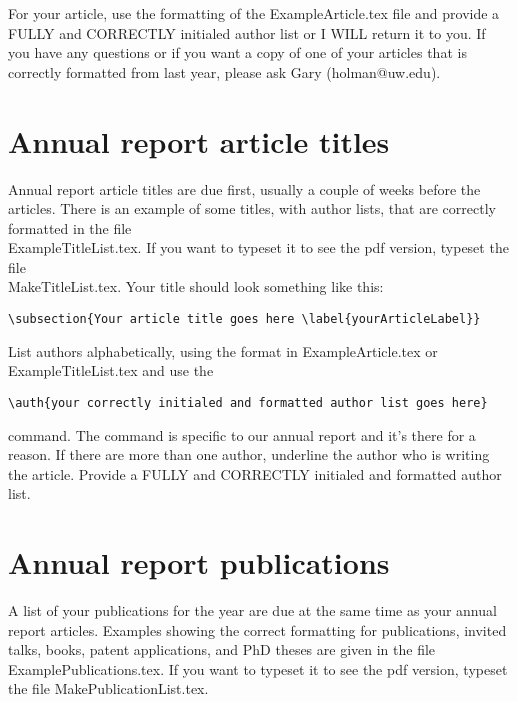 \documentclass[twoside,11pt]{article}
\begin{document}
\noindent
For your article, use the formatting of the ExampleArticle.tex file and provide a FULLY and CORRECTLY initialed author list or I WILL return it to you. If you have any questions or if you want a copy of one of your articles that is correctly formatted from last year, please ask Gary (holman@uw.edu).

\section{Annual report article titles}

Annual report article titles are due first, usually a couple of weeks before the articles. There is an example of some titles, with author lists, that are correctly formatted in the file \\ ExampleTitleList.tex. If you want to typeset it to see the pdf version, typeset the file \\ MakeTitleList.tex. Your title should look something like this:

\begin{verbatim}
\subsection{Your article title goes here \label{yourArticleLabel}} 
\end{verbatim}

\noindent
List authors alphabetically, using the format in ExampleArticle.tex or ExampleTitleList.tex and use the 

\begin{verbatim} 
\auth{your correctly initialed and formatted author list goes here} 
\end{verbatim} 

\noindent
command. The command is specific to our annual report and it's there for a reason. If there are more than one author, underline the author who is writing the article. Provide a FULLY and CORRECTLY initialed and formatted author list.


\section{Annual report publications}

A list of your publications for the year are due at the same time as your annual report articles. Examples showing the correct formatting for publications, invited talks, books, patent applications, and PhD theses are given in the file ExamplePublications.tex. If you want to typeset it to see the pdf version, typeset the file MakePublicationList.tex.
\end{document}
